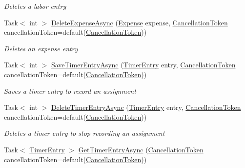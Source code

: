 \begin{DoxyCompactItemize}
\begin{DoxyCompactList}\small\item\em Deletes a labor entry \end{DoxyCompactList}\item 
Task$<$ int $>$ \hyperlink{interface_field_service_1_1_i_assignment_service_aaa5c70766e6945cb7bae35660b7ccde8}{Delete\+Expense\+Async} (\hyperlink{class_field_service_1_1_data_1_1_expense}{Expense} expense, \hyperlink{_view_models_2_assignment_view_model_8cs_aba80ec766846c61f55644fd23860cb18}{Cancellation\+Token} cancellation\+Token=default(\hyperlink{_view_models_2_assignment_view_model_8cs_aba80ec766846c61f55644fd23860cb18}{Cancellation\+Token}))
\begin{DoxyCompactList}\small\item\em Deletes an expense entry \end{DoxyCompactList}\item 
Task$<$ int $>$ \hyperlink{interface_field_service_1_1_i_assignment_service_ab10e11786b78d7f21cf9a40482336109}{Save\+Timer\+Entry\+Async} (\hyperlink{class_field_service_1_1_data_1_1_timer_entry}{Timer\+Entry} entry, \hyperlink{_view_models_2_assignment_view_model_8cs_aba80ec766846c61f55644fd23860cb18}{Cancellation\+Token} cancellation\+Token=default(\hyperlink{_view_models_2_assignment_view_model_8cs_aba80ec766846c61f55644fd23860cb18}{Cancellation\+Token}))
\begin{DoxyCompactList}\small\item\em Saves a timer entry to record an assignment \end{DoxyCompactList}\item 
Task$<$ int $>$ \hyperlink{interface_field_service_1_1_i_assignment_service_a7e32c4c791c3ec37bc5acac9b913fc80}{Delete\+Timer\+Entry\+Async} (\hyperlink{class_field_service_1_1_data_1_1_timer_entry}{Timer\+Entry} entry, \hyperlink{_view_models_2_assignment_view_model_8cs_aba80ec766846c61f55644fd23860cb18}{Cancellation\+Token} cancellation\+Token=default(\hyperlink{_view_models_2_assignment_view_model_8cs_aba80ec766846c61f55644fd23860cb18}{Cancellation\+Token}))
\begin{DoxyCompactList}\small\item\em Deletes a timer entry to stop recording an assignment \end{DoxyCompactList}\item 
Task$<$ \hyperlink{class_field_service_1_1_data_1_1_timer_entry}{Timer\+Entry} $>$ \hyperlink{interface_field_service_1_1_i_assignment_service_a4d63a502ce10e3206bd617216fcfa534}{Get\+Timer\+Entry\+Async} (\hyperlink{_view_models_2_assignment_view_model_8cs_aba80ec766846c61f55644fd23860cb18}{Cancellation\+Token} cancellation\+Token=default(\hyperlink{_view_models_2_assignment_view_model_8cs_aba80ec766846c61f55644fd23860cb18}{Cancellation\+Token}))

\end{DoxyCompactItemize}
